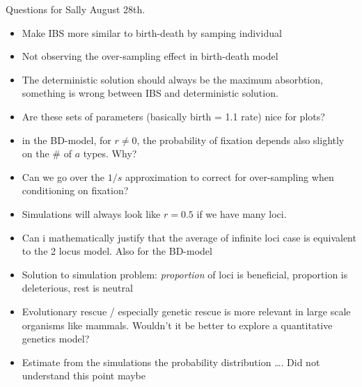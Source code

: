 \documentclass{beamer}
\begin{document}
\begin{frame}{Questions for Sally August 28th.}
\begin{itemize}
\footnotesize
    \item Make IBS more similar to birth-death by samping individual 
    \item Not observing the over-sampling effect in birth-death model
    \item The deterministic solution should always be the maximum absorbtion, something is wrong between IBS and deterministic solution. 
    \item Are these sets of parameters (basically birth = 1.1 rate) nice for plots?
    \item in the BD-model, for $r\neq 0$, the probability of fixation depends also slightly on the \# of $a$ types. Why?
    \item Can we go over the $1/s$ approximation to correct for over-sampling when conditioning on fixation?
    \item Simulations will always look like $r=0.5$ if we have many loci.
    \item Can i mathematically justify that the average of infinite loci case is equivalent to the 2 locus model. Also for the BD-model
    \item Solution to simulation problem: \textit{proportion} of loci is beneficial, proportion is deleterious, rest is neutral
    \item Evolutionary rescue / especially genetic rescue is more relevant in large scale organisms like mammals. Wouldn't it be better to explore a quantitative genetics model?
    \item Estimate from the simulations the probability distribution \dots. Did not understand this point maybe
    \normalsize
\end{itemize}
    
\end{frame}

\fi
\end{document}
